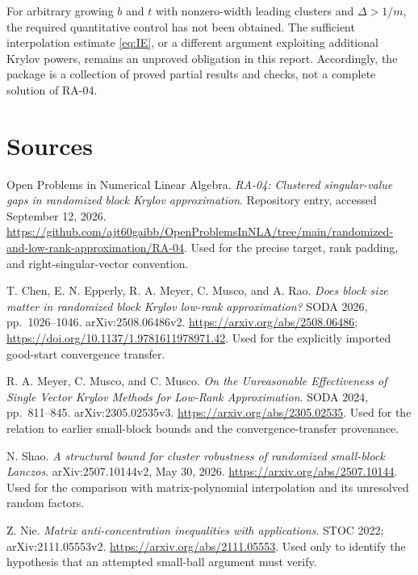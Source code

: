 \documentclass[11pt]{article}
\theoremstyle{definition}
\begin{document}
For arbitrary growing $b$ and $t$ with nonzero-width leading clusters and
$\Delta>1/m$, the required quantitative control has not been obtained. The sufficient
interpolation estimate \eqref{eq:IE}, or a different argument exploiting
additional Krylov powers, remains an unproved obligation in this report.
Accordingly, the package is a collection of proved partial results and
checks, not a complete solution of RA-04.

\section*{Sources}
\begin{enumerate}[label={[\arabic*]},leftmargin=2em,itemsep=7pt]
\item Open Problems in Numerical Linear Algebra.
\emph{RA-04: Clustered singular-value gaps in randomized block Krylov approximation}.
Repository entry, accessed September 12, 2026.
\url{https://github.com/ajt60gaibb/OpenProblemsInNLA/tree/main/randomized-and-low-rank-approximation/RA-04}.
Used for the precise target, rank padding, and right-singular-vector convention.
\item T. Chen, E. N. Epperly, R. A. Meyer, C. Musco, and A. Rao.
\emph{Does block size matter in randomized block Krylov low-rank approximation?}
SODA 2026, pp.~1026--1046. arXiv:2508.06486v2.
\url{https://arxiv.org/abs/2508.06486};
\url{https://doi.org/10.1137/1.9781611978971.42}.
Used for the explicitly imported good-start convergence transfer.
\item R. A. Meyer, C. Musco, and C. Musco.
\emph{On the Unreasonable Effectiveness of Single Vector Krylov Methods for Low-Rank Approximation}.
SODA 2024, pp.~811--845. arXiv:2305.02535v3.
\url{https://arxiv.org/abs/2305.02535}.
Used for the relation to earlier small-block bounds and the convergence-transfer provenance.
\item N. Shao. \emph{A structural bound for cluster robustness of randomized small-block Lanczos}.
arXiv:2507.10144v2, May 30, 2026.
\url{https://arxiv.org/abs/2507.10144}.
Used for the comparison with matrix-polynomial interpolation and its unresolved random factors.
\item Z. Nie. \emph{Matrix anti-concentration inequalities with applications}.
STOC 2022; arXiv:2111.05553v2.
\url{https://arxiv.org/abs/2111.05553}.
Used only to identify the hypothesis that an attempted small-ball argument must verify.
\end{enumerate}
\end{document}
